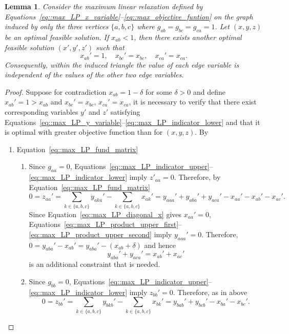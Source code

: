 \documentclass[11pt]{article}
\newtheorem{lemma}{Lemma}
\begin{document}
\begin{lemma}\label{lemma::triangle_edge_independence}
  Consider the maximum linear relaxation defined by Equations~\eqref{eq::max_LP_x_variable}--\eqref{eq::max_objective_funtion} on the graph induced by only the three vertices $\{a,b,c\}$ where $g_{ab}=g_{bc}=g_{ca}=1$. Let $(x,y,z)$ be an optimal feasible solution. If $x_{ab}<1$, then there exists another optimal feasible solution $(x',y',z')$ such that
  \[
  x_{ab}'=1,\quad x_{bc}'=x_{bc},\quad x_{ca}'=x_{ca}.
  \]
  Consequently, within the induced triangle the value of each edge variable is independent of the values of the other two edge variables.
\end{lemma}
\begin{proof}
  Suppose for contradiction $x_{ab}=1-\delta$ for some $\delta>0$ and define $x_{ab}' = 1 > x_{ab}$ and $x_{bc}'=x_{bc}$, $x_{ca}'=x_{ca}$, it is necessary to verify that there exist corresponding variables $y'$ and $z'$ satisfying Equations~\eqref{eq::max_LP_y_variable}--\eqref{eq::max_LP_indicator_lower} and that it is optimal with greater objective function than for $(x,y,z)$. By 
  \begin{enumerate}[label=\Alph*.] 
    \item Equation~\eqref{eq::max_LP_fund_matrix}
      \begin{enumerate}[label=(\roman*)]
        \item Since $g_{aa} = 0$, Equations~\eqref{eq::max_LP_indicator_upper}--\eqref{eq::max_LP_indicator_lower} imply $z'_{aa} = 0$. Therefore, by     Equation~\eqref{eq::max_LP_fund_matrix}
          \[
          0 = z_{aa}' = \sum_{k\in\{a,b,c\}}y_{aka}' -\sum_{k\in\{a,b,c\}}x_{ak}' = y_{aaa}'+y_{aba}'+y_{aca}' -x_{aa}'-x_{ab}'-x_{ac}'.
          \]
          Since Equation~\eqref{eq::max_LP_diagonal_x} gives $x_{aa}'=0$, Equations~\eqref{eq::max_LP_product_upper_first}--\eqref{eq::max_LP_product_upper_second} imply $y_{aaa}'=0$. Therefore, $0 = y_{aba}'-x_{ab}' = y_{aba}'-(x_{ab}+\delta)$ and hence 
          \begin{equation} \label{eq::y_aba_aca}
            y_{aba}'+y_{aca}'=x_{ab}'+x_{ac}'
          \end{equation} 
          is an additional constraint that is needed.
        \item Since $g_{bb}=0$, Equations~\eqref{eq::max_LP_indicator_upper}--\eqref{eq::max_LP_indicator_lower} imply $z_{bb}'=0$. Therefore, as in above
          \[
          0 = z_{bb}' = \sum_{k\in\{a,b,c\}}y_{bkb}' -\sum_{k\in\{a,b,c\}}x_{bk}' = y_{bab}' + y_{bcb}' - x_{ba}' - x_{bc}'.
\]
\end{enumerate}
\end{enumerate}
\end{proof}
\end{document}
